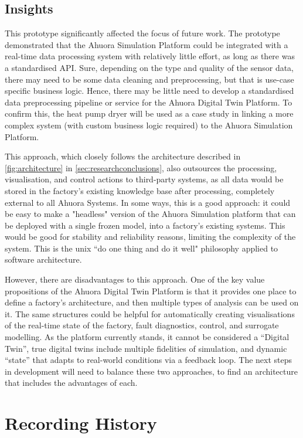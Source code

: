 \documentclass[12pt]{report}
\begin{document}
\section{Insights}

This prototype significantly affected the focus of future work. The prototype demonstrated that the Ahuora Simulation Platform could be integrated with a real-time data processing system with relatively little effort, as long as there was a standardised API. Sure, depending on the type and quality of the sensor data, there may need to be some data cleaning and preprocessing, but that is use-case specific business logic. Hence, there may be little need to develop a standardised data preprocessing pipeline or service for the Ahuora Digital Twin Platform.
To confirm this, the heat pump dryer will be used as a case study in linking a more complex system (with custom business logic required) to the Ahuora Simulation Platform.

This approach, which closely follows the architecture described in \cref{fig:architecture} in \cref{sec:researchconclusions}, also outsources the processing, visualisation, and control actions to third-party systems, as all data would be stored in the factory's existing knowledge base after processing, completely external to all Ahuora Systems. In some ways, this is a good approach: it could be easy to make a "headless" version of the Ahuora Simulation platform that can be deployed with a single frozen model, into a factory's existing systems. This would be good for stability and reliability reasons, limiting the complexity of the system. This is the unix ``do one thing and do it well" philosophy applied to software architecture.

However, there are disadvantages to this approach. One of the key value propositions of the Ahuora Digital Twin Platform is that it provides one place to define a factory's architecture, and then multiple types of analysis can be used on it. The same structures could be helpful for automatically creating visualisations of the real-time state of the factory, fault diagnostics, control, and surrogate modelling. As the platform currently stands, it cannot be considered a ``Digital Twin'', true digital twins include multiple fidelities of simulation, and dynamic ``state'' that adapts to real-world conditions via a feedback loop. The next steps in development will need to balance these two approaches, to find an architecture that includes the advantages of each.


\chapter{Recording History}
\end{document}
